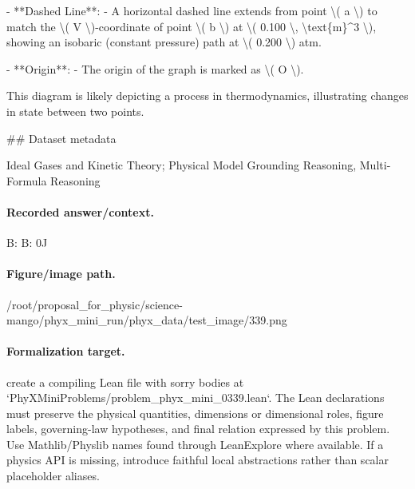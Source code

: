 - **Dashed Line**:
  - A horizontal dashed line extends from point \textbackslash{}( a \textbackslash{}) to match the \textbackslash{}( V \textbackslash{})-coordinate of point \textbackslash{}( b \textbackslash{}) at \textbackslash{}( 0.100 \textbackslash{}, \textbackslash{}text\{m\}\textasciicircum{}3 \textbackslash{}), showing an isobaric (constant pressure) path at \textbackslash{}( 0.200 \textbackslash{}) atm.

- **Origin**:
  - The origin of the graph is marked as \textbackslash{}( O \textbackslash{}).

This diagram is likely depicting a process in thermodynamics, illustrating changes in state between two points.

\#\# Dataset metadata

Ideal Gases and Kinetic Theory; Physical Model Grounding Reasoning, Multi-Formula Reasoning

\paragraph{Recorded answer/context.}
B: B: 0J

\paragraph{Figure/image path.}
/root/proposal\_for\_physic/science-mango/phyx\_mini\_run/phyx\_data/test\_image/339.png

\paragraph{Formalization target.}
create a compiling Lean file with sorry bodies at `PhyXMiniProblems/problem\_phyx\_mini\_0339.lean`. The Lean declarations must preserve the physical quantities, dimensions or dimensional roles, figure labels, governing-law hypotheses, and final relation expressed by this problem.
Use Mathlib/Physlib names found through LeanExplore where available. If a physics API is missing, introduce faithful local abstractions rather than scalar placeholder aliases.

